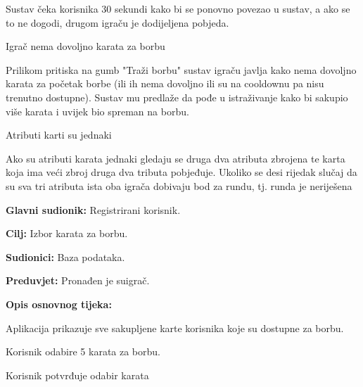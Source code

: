 \begin{packed_item}
\begin{packed_item}
\begin{packed_enum}
							\item  Sustav čeka korisnika 30 sekundi kako bi se ponovno povezao u sustav, a ako se to ne dogodi, drugom igraču je dodijeljena pobjeda.
							
						\end{packed_enum}
						\item[2.a] Igrač nema dovoljno karata za borbu
						\item[] \begin{packed_enum}
							
							\item  Prilikom pritiska na gumb "Traži borbu" sustav igraču javlja kako nema dovoljno karata za početak borbe (ili ih nema dovoljno ili su na cooldownu pa nisu trenutno dostupne). Sustav mu predlaže da pođe u istraživanje kako bi sakupio više karata i uvijek bio spreman na borbu.
							
						\end{packed_enum}
					\item[5.a] Atributi karti su jednaki
					\item[] \begin{packed_enum}
						
						\item  Ako su atributi karata jednaki gledaju se druga dva atributa zbrojena te karta koja ima veći zbroj druga dva tributa pobjeđuje. Ukoliko se desi rijedak slučaj da su sva tri atributa ista oba igrača dobivaju bod za rundu, tj. runda je neriješena
						
					\end{packed_enum}
						
					\end{packed_item}
				\end{packed_item}
				
				\noindent {}
				\begin{packed_item}
					
					\item \textbf{Glavni sudionik: }Registrirani korisnik.
					\item  \textbf{Cilj:} Izbor karata za borbu.
					\item  \textbf{Sudionici:} Baza podataka.
					\item  \textbf{Preduvjet:} Pronađen je suigrač.
					\item  \textbf{Opis osnovnog tijeka:}
					
					\item[] \begin{packed_enum}
						
						\item Aplikacija prikazuje sve sakupljene karte korisnika koje su dostupne za borbu.
						\item Korisnik odabire 5 karata za borbu. 
						\item Korisnik potvrđuje odabir karata
					\end{packed_enum}
					
					
				\end{packed_item}
				
